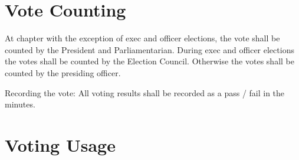 \section{Vote Counting}
\label{sec:vote-counting}

At chapter with the exception of exec and officer elections, the vote shall be
counted by the President and Parliamentarian.
During exec and officer elections the votes shall be counted by the Election
Council.
Otherwise the votes shall be counted by the presiding officer.

Recording the vote: All voting results shall be recorded as a pass / fail in the
minutes.

\section{Voting Usage}
\label{sec:voting-usage}

